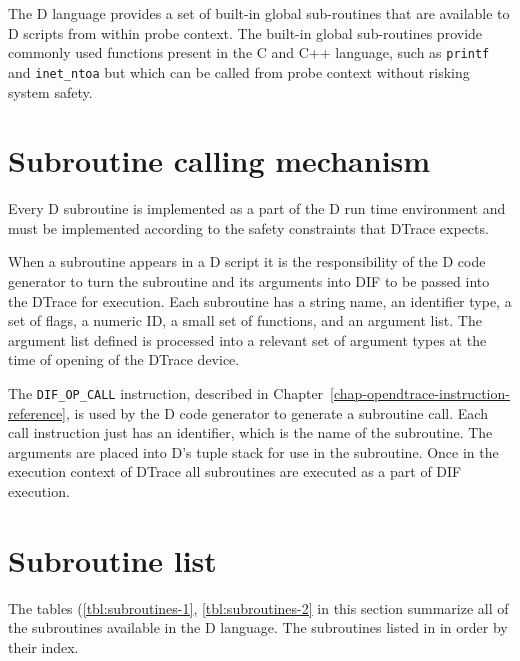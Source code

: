The D language provides a set of built-in global sub-routines that are
available to D scripts from within probe context.  The built-in global
sub-routines provide commonly used functions present in the C and C++
language, such as \verb|printf| and \verb|inet_ntoa| but which can be
called from probe context without risking system safety.

\section{Subroutine calling mechanism}

Every D subroutine is implemented as a part of the D run time
environment and must be implemented according to the safety constraints
that DTrace expects.

When a subroutine appears in a D script it is the responsibility of
the D code generator to turn the subroutine and its arguments into DIF
to be passed into the DTrace for execution. Each subroutine has a string name,
an identifier type, a set of flags, a numeric ID, a small set of
functions, and an argument list.  The argument list defined is processed
into a relevant set of argument types at the time of opening of the DTrace
device.

The \verb|DIF_OP_CALL| instruction, described in
Chapter~\ref{chap-opendtrace-instruction-reference}, is used by the D
code generator to generate a subroutine call.  Each call instruction just
has an identifier, which is the name of the subroutine. The arguments are
placed into D's tuple stack for use in the subroutine. Once in the
execution context of DTrace all subroutines are executed as a part
of DIF execution.

\section{Subroutine list}
\label{sec:subroutine-list}

The tables (\ref{tbl:subroutines-1}, \ref{tbl:subroutines-2} in this
section summarize all of the subroutines available in the D language.
The subroutines listed in in order by their index.

